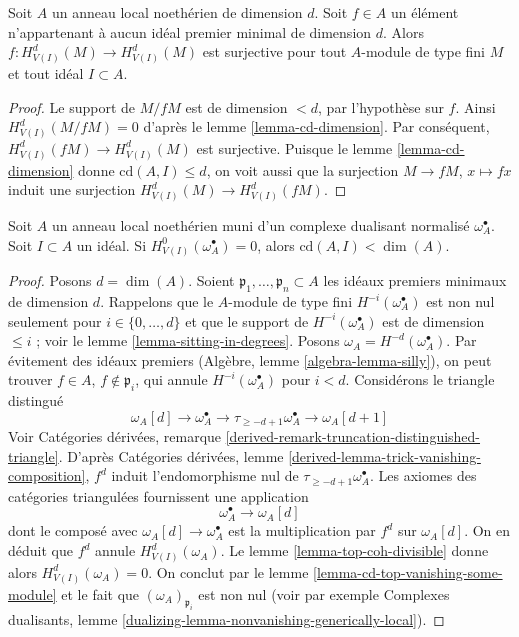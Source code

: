 \begin{lemma}
\label{lemma-top-coh-divisible}
Soit $A$ un anneau local noethérien de dimension $d$. Soit $f \in A$ un élément n'appartenant à aucun idéal premier minimal de dimension $d$. Alors $f : H^d_{V(I)}(M) \to H^d_{V(I)}(M)$ est surjective pour tout $A$-module de type fini $M$ et tout idéal $I \subset A$.
\end{lemma}

\begin{proof}
Le support de $M/fM$ est de dimension $< d$, par l'hypothèse sur $f$. Ainsi $H^d_{V(I)}(M/fM) = 0$ d'après le lemme \ref{lemma-cd-dimension}. Par conséquent, $H^d_{V(I)}(fM) \to H^d_{V(I)}(M)$ est surjective. Puisque le lemme \ref{lemma-cd-dimension} donne $\text{cd}(A, I) \leq d$, on voit aussi que la surjection $M \to fM$, $x \mapsto fx$ induit une surjection $H^d_{V(I)}(M) \to H^d_{V(I)}(fM)$.
\end{proof}

\begin{lemma}
\label{lemma-cd-bound-dualizing}
Soit $A$ un anneau local noethérien muni d'un complexe dualisant normalisé $\omega_A^\bullet$. Soit $I \subset A$ un idéal. Si $H^0_{V(I)}(\omega_A^\bullet) = 0$, alors $\text{cd}(A, I) < \dim(A)$.
\end{lemma}

\begin{proof}
Posons $d = \dim(A)$. Soient $\mathfrak p_1, \ldots, \mathfrak p_n \subset A$ les idéaux premiers minimaux de dimension $d$. Rappelons que le $A$-module de type fini $H^{-i}(\omega_A^\bullet)$ est non nul seulement pour $i \in \{0, \ldots, d\}$ et que le support de $H^{-i}(\omega_A^\bullet)$ est de dimension $\leq i$ ; voir le lemme \ref{lemma-sitting-in-degrees}. Posons $\omega_A = H^{-d}(\omega_A^\bullet)$. Par évitement des idéaux premiers (Algèbre, lemme \ref{algebra-lemma-silly}), on peut trouver $f \in A$, $f \not \in \mathfrak p_i$, qui annule $H^{-i}(\omega_A^\bullet)$ pour $i < d$. Considérons le triangle distingué
$$
\omega_A[d] \to \omega_A^\bullet \to
\tau_{\geq -d + 1}\omega_A^\bullet \to \omega_A[d + 1]
$$
Voir Catégories dérivées, remarque \ref{derived-remark-truncation-distinguished-triangle}. D'après Catégories dérivées, lemme \ref{derived-lemma-trick-vanishing-composition}, $f^d$ induit l'endomorphisme nul de $\tau_{\geq -d + 1}\omega_A^\bullet$. Les axiomes des catégories triangulées fournissent une application
$$
\omega_A^\bullet \to \omega_A[d]
$$
dont le composé avec $\omega_A[d] \to \omega_A^\bullet$ est la multiplication par $f^d$ sur $\omega_A[d]$. On en déduit que $f^d$ annule $H^d_{V(I)}(\omega_A)$. Le lemme \ref{lemma-top-coh-divisible} donne alors $H^d_{V(I)}(\omega_A) = 0$. On conclut par le lemme \ref{lemma-cd-top-vanishing-some-module} et le fait que $(\omega_A)_{\mathfrak p_i}$ est non nul (voir par exemple Complexes dualisants, lemme \ref{dualizing-lemma-nonvanishing-generically-local}).
\end{proof}

